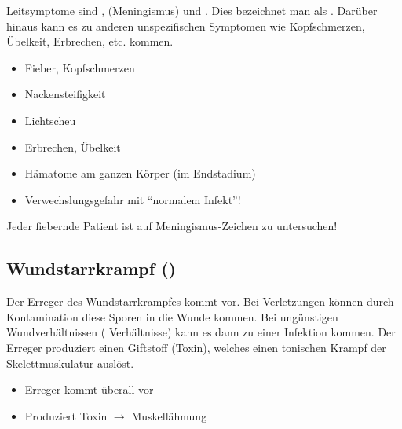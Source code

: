  
 
\TextSlide{\TxSymptome}
{%
\label{topic:meningismuszeichen}
Leitsymptome sind , 
(Meningismus) und . Dies bezeichnet man als
. 
Darüber hinaus kann es zu anderen unspezifischen Symptomen
wie Kopfschmerzen, Übelkeit, Erbrechen, etc. kommen.



}{
\begin{itemize}
  \item Fieber, Kopfschmerzen
  \item Nackensteifigkeit
  \item Lichtscheu
  \item Erbrechen, Übelkeit
  \item Hämatome am ganzen Körper (im Endstadium)
  \item Verwechslungsgefahr mit \enquote{normalem Infekt}!
\end{itemize}

}{}{}{}

\begin{Synopsis}
\end{Synopsis}
\begin{Danger}
  \item Jeder fiebernde Patient ist auf Meningismus-Zeichen zu untersuchen!
\end{Danger}



\subsection{Wundstarrkrampf ()}
\label{topic:Wundstarrkrampf}

\TextSlide
{\TxBeschreibung}
{Der Erreger des Wundstarrkrampfes kommt  vor. Bei
Verletzungen können durch Kontamination diese Sporen in die
Wunde kommen. Bei ungünstigen Wundverhältnissen
( Verhältnisse) kann es dann zu einer
Infektion kommen. Der Erreger produziert
einen Giftstoff (Toxin), welches einen tonischen Krampf der
Skelettmuskulatur auslöst. 

}
{
\begin{itemize}
  \item Erreger kommt überall vor
  \item Produziert Toxin $\rightarrow$ Muskellähmung
\end{itemize}
}
{}
{}
{}

